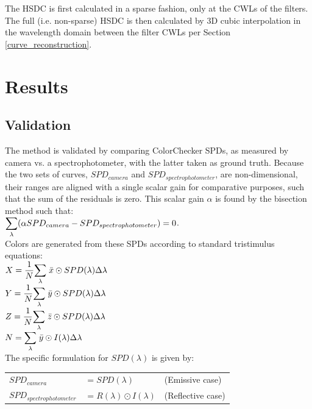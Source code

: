 \documentclass[twocolumn,10pt]{asme2ej}
\newcommand{\id}{\hspace{6 mm}}
\begin{document}
\id The HSDC is first calculated in a sparse fashion, only at the CWLs of the filters. The full (i.e. non-sparse) HSDC is then calculated by 3D cubic interpolation in the wavelength domain between the filter CWLs per Section \ref{curve_reconstruction}.

\section{Results}
\subsection{Validation}
\label{validation}

The method is validated by comparing ColorChecker SPDs, as measured by camera vs. a spectrophotometer, with the latter taken as ground truth. Because the two sets of curves, $SPD_{camera}$ and $SPD_{spectrophotometer}$, are non-dimensional, their ranges are aligned with a single scalar gain for comparative purposes, such that the sum of the residuals is zero. This scalar gain $\alpha$ is found by the bisection method such that:\\

$\mathlarger{ \sum_{\lambda}} ( \alpha SPD_{camera}- SPD_{spectrophotometer} )=0$. \\

Colors are generated from these SPDs according to standard tristimulus equations: \cite{CVRL} \cite{Lindbloom}\\

$X = \dfrac{1}{N} \mathlarger{ \sum_{\lambda}} \hspace{1 mm} \bar{x} \odot SPD(\lambda) \Delta \lambda$\\
$Y = \dfrac{1}{N} \mathlarger{ \sum_{\lambda}} \hspace{1 mm} \bar{y} \odot SPD(\lambda) \Delta \lambda$\\
$Z = \dfrac{1}{N} \mathlarger{ \sum_{\lambda}} \hspace{1 mm} \bar{z} \odot SPD(\lambda) \Delta \lambda$\\
$N = \mathlarger{ \sum_{\lambda}} \hspace{1 mm} \bar{y} \odot I(\lambda) \Delta \lambda$\\

The specific formulation for $SPD(\lambda)$ is given by:\\

\begin{tabular}{l l l}
$SPD_{camera}$ & $= SPD(\lambda)$ & (Emissive case) \\
$SPD_{spectrophotometer}$ & $= R(\lambda) \odot I(\lambda)$ & (Reflective case) \\
\end{tabular}\\
\end{document}
